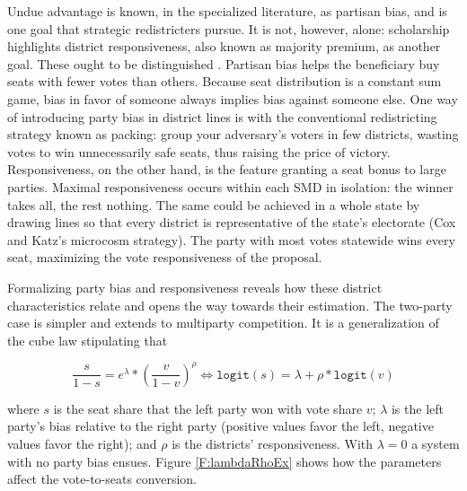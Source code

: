 \documentclass[letter,12pt]{article}
\begin{document}
Undue advantage is known, in the specialized literature, as partisan bias, and is one goal that strategic redistricters pursue. It is not, however, alone: scholarship highlights district responsiveness, also known as majority premium, as another goal. These ought to be distinguished \citep[this explication draws heavily on][, ch.\ 3]{cox.katz.2002}. Partisan bias helps the beneficiary buy seats with fewer votes than others. Because seat distribution is a constant sum game, bias in favor of someone always implies bias against someone else. One way of introducing party bias in district lines is with the conventional redistricting strategy known as packing: group your adversary's voters in few districts, wasting votes to win unnecessarily safe seats, thus raising the price of victory. Responsiveness, on the other hand, is the feature granting a seat bonus to large parties. Maximal responsiveness occurs within each SMD in isolation: the winner takes all, the rest nothing. The same could be achieved in a whole state by drawing lines so that every district is representative of the state's electorate (Cox and Katz's microcosm strategy). The party with most votes statewide wins every seat, maximizing the vote responsiveness of the proposal. 

Formalizing party bias and responsiveness reveals how these district characteristics relate and opens the way towards their estimation. The two-party case is simpler \citep{taagepera.CubeLaw.1973,tufte1973seatsVotes,king.browning1987biasRespUS} and extends to multiparty competition. It is a generalization of the cube law stipulating that 

\begin{equation}\label{E:kingBi}
 \frac{s}{1-s} = e^\lambda *  \left(\frac{v}{1-v}\right)^\rho \iff
 \texttt{logit}(s) = \lambda + \rho *  \texttt{logit}(v)
\end{equation}\label{E:cubeLaw}

\noindent where $s$ is the seat share that the left party won with vote share $v$; $\lambda$ is the left party's bias relative to the right party (positive values favor the left, negative values favor the right); and $\rho$ is the districts' responsiveness. With $\lambda=0$ a system with no party bias ensues. Figure \ref{F:lambdaRhoEx} shows how the parameters affect the vote-to-seats conversion. 

\end{document}
